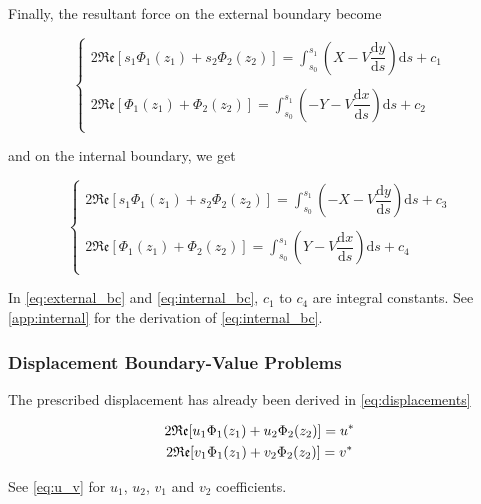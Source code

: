 \documentclass{article}
\begin{document}
Finally, the resultant force on the external boundary become

\begin{equation}
\left\{\begin{matrix}
    2 \mathfrak{Re}[s_1 \Phi_1(z_1) + s_2 \Phi_2(z_2)] = \displaystyle\int_{s_0}^{s_1}{\left (X - V \dfrac{\mathrm{d}y}{\mathrm{d}s}\right)} \mathrm{d}s + c_1\\
    \\
    2 \mathfrak{Re}[\Phi_1(z_1) + \Phi_2(z_2)] = \displaystyle\int_{s_0}^{s_1}{\left(-Y - V \dfrac{\mathrm{d}x}{\mathrm{d}s}\right)}\mathrm{d}s + c_2\\ 
\end{matrix}\right.
    \label{eq:external_bc}
\end{equation}

and on the internal boundary, we get

\begin{equation}
\left\{\begin{matrix}
    2 \mathfrak{Re}[s_1 \Phi_1(z_1) + s_2 \Phi_2(z_2)] = \displaystyle\int_{s_0}^{s_1}{\left (-X - V \dfrac{\mathrm{d}y}{\mathrm{d}s}\right)} \mathrm{d}s + c_3\\
    \\
    2 \mathfrak{Re}[\Phi_1(z_1) + \Phi_2(z_2)] = \displaystyle\int_{s_0}^{s_1}{\left(Y - V \dfrac{\mathrm{d}x}{\mathrm{d}s}\right)}\mathrm{d}s + c_4\\ 
\end{matrix}\right.
    \label{eq:internal_bc}
\end{equation}

In \cref{eq:external_bc} and \cref{eq:internal_bc}, $c_1$ to $c_4$ are integral constants. See \cref{app:internal} for the derivation of \cref{eq:internal_bc}. \\

\subsubsection{Displacement Boundary-Value Problems}
The prescribed displacement has already been derived in \cref{eq:displacements}

\begin{gather}
    2 \mathfrak{Re}[u_1 \Phi_1(z_1) + u_2 \Phi_2(z_2)] = u^* \notag \\
    2 \mathfrak{Re}[v_1 \Phi_1(z_1) + v_2 \Phi_2(z_2)] = v^*
    \label{eq:displ_bc}
\end{gather}

See \cref{eq:u_v} for $u_1$, $u_2$, $v_1$ and $v_2$ coefficients.
\end{document}
